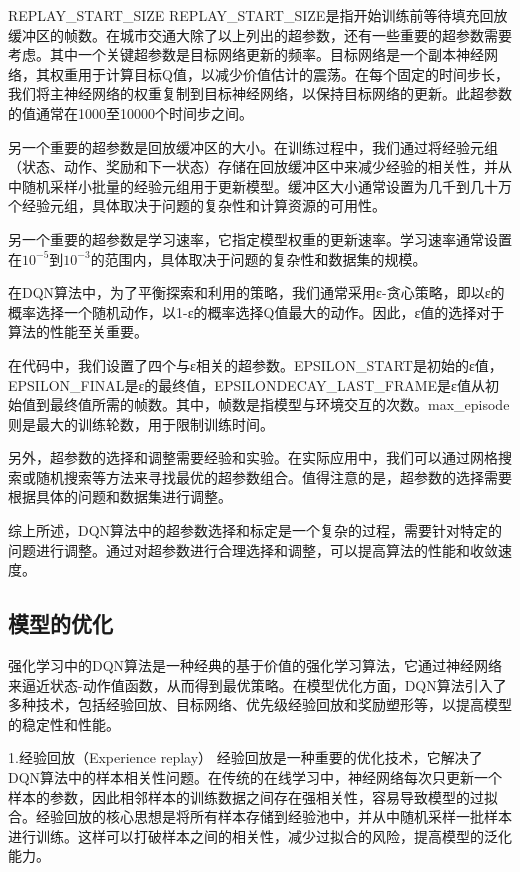 REPLAY\_START\_SIZE
REPLAY\_START\_SIZE是指开始训练前等待填充回放缓冲区的帧数。在城市交通大除了以上列出的超参数，还有一些重要的超参数需要考虑。其中一个关键超参数是目标网络更新的频率。目标网络是一个副本神经网络，其权重用于计算目标Q值，以减少价值估计的震荡。在每个固定的时间步长，我们将主神经网络的权重复制到目标神经网络，以保持目标网络的更新。此超参数的值通常在1000至10000个时间步之间。

另一个重要的超参数是回放缓冲区的大小。在训练过程中，我们通过将经验元组（状态、动作、奖励和下一状态）存储在回放缓冲区中来减少经验的相关性，并从中随机采样小批量的经验元组用于更新模型。缓冲区大小通常设置为几千到几十万个经验元组，具体取决于问题的复杂性和计算资源的可用性。

另一个重要的超参数是学习速率，它指定模型权重的更新速率。学习速率通常设置在$10^{-5}$到$10^{-3}$的范围内，具体取决于问题的复杂性和数据集的规模。

在DQN算法中，为了平衡探索和利用的策略，我们通常采用ε-贪心策略，即以ε的概率选择一个随机动作，以1-ε的概率选择Q值最大的动作。因此，ε值的选择对于算法的性能至关重要。

在代码中，我们设置了四个与ε相关的超参数。EPSILON\_START是初始的ε值，EPSILON\_FINAL是ε的最终值，EPSILONDECAY\_LAST\_FRAME是ε值从初始值到最终值所需的帧数。其中，帧数是指模型与环境交互的次数。max\_episode则是最大的训练轮数，用于限制训练时间。

另外，超参数的选择和调整需要经验和实验。在实际应用中，我们可以通过网格搜索或随机搜索等方法来寻找最优的超参数组合。值得注意的是，超参数的选择需要根据具体的问题和数据集进行调整。

综上所述，DQN算法中的超参数选择和标定是一个复杂的过程，需要针对特定的问题进行调整。通过对超参数进行合理选择和调整，可以提高算法的性能和收敛速度。

\subsection{模型的优化}

强化学习中的DQN算法是一种经典的基于价值的强化学习算法，它通过神经网络来逼近状态-动作值函数，从而得到最优策略。在模型优化方面，DQN算法引入了多种技术，包括经验回放、目标网络、优先级经验回放和奖励塑形等，以提高模型的稳定性和性能。

1.经验回放（Experience replay）
经验回放是一种重要的优化技术，它解决了DQN算法中的样本相关性问题。在传统的在线学习中，神经网络每次只更新一个样本的参数，因此相邻样本的训练数据之间存在强相关性，容易导致模型的过拟合。经验回放的核心思想是将所有样本存储到经验池中，并从中随机采样一批样本进行训练。这样可以打破样本之间的相关性，减少过拟合的风险，提高模型的泛化能力。

